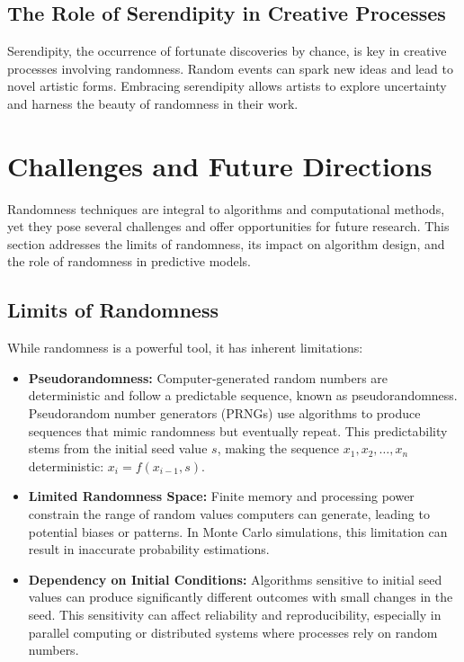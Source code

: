 \documentclass[12pt]{book} %
\begin{document}
\subsection{The Role of Serendipity in Creative Processes}

Serendipity, the occurrence of fortunate discoveries by chance, is key in creative processes involving randomness. Random events can spark new ideas and lead to novel artistic forms. Embracing serendipity allows artists to explore uncertainty and harness the beauty of randomness in their work.


\section{Challenges and Future Directions}
Randomness techniques are integral to algorithms and computational methods, yet they pose several challenges and offer opportunities for future research. This section addresses the limits of randomness, its impact on algorithm design, and the role of randomness in predictive models.

\subsection{Limits of Randomness}
While randomness is a powerful tool, it has inherent limitations:

\begin{itemize}
    \item \textbf{Pseudorandomness:} Computer-generated random numbers are deterministic and follow a predictable sequence, known as pseudorandomness. Pseudorandom number generators (PRNGs) use algorithms to produce sequences that mimic randomness but eventually repeat. This predictability stems from the initial seed value \(s\), making the sequence \(x_1, x_2, \ldots, x_n\) deterministic: \(x_i = f(x_{i-1}, s)\).
    
    \item \textbf{Limited Randomness Space:} Finite memory and processing power constrain the range of random values computers can generate, leading to potential biases or patterns. In Monte Carlo simulations, this limitation can result in inaccurate probability estimations.
    
    \item \textbf{Dependency on Initial Conditions:} Algorithms sensitive to initial seed values can produce significantly different outcomes with small changes in the seed. This sensitivity can affect reliability and reproducibility, especially in parallel computing or distributed systems where processes rely on random numbers.
\end{itemize}
\end{document}
